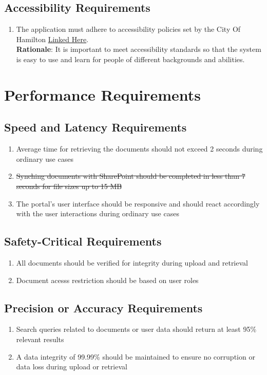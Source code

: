 \documentclass[12pt]{article}
\begin{document}
\subsection{Accessibility Requirements}
\begin{enumerate}[{UH-AS}1.]
  \item The application must adhere to accessibility policies set by the City Of
    Hamilton
    \href{https://www.hamilton.ca/people-programs/inclusion-diversity-equity-accessibility/accessibility-services/accessibility#policies-procedures}{Linked
    Here}.\\
    \textbf{Rationale}: It is important to meet accessibility standards so that
    the system is easy to use and learn for people of different backgrounds and
    abilities.
\end{enumerate}
\section{Performance Requirements}
\subsection{Speed and Latency Requirements}
\begin{enumerate}[{PR-SL}1.]
  \item Average time for retrieving the documents should not exceed 2 seconds during ordinary use cases
  \item \sout{Synching documents with SharePoint should be completed in
    less than 7 seconds for file sizes up to 15 MB}
  \item The portal's user interface should be responsive and should
    react accordingly with the user interactions during ordinary use cases
\end{enumerate}
\subsection{Safety-Critical Requirements}
\begin{enumerate}[{PR-SC}1.]
  \item All documents should be verified for integrity during upload
    and retrieval
  \item Document acesss restriction should be based on user roles
\end{enumerate}
\subsection{Precision or Accuracy Requirements}
\begin{enumerate}[{PR-PA}1.]
  \item Search queries related to documents or user data should
    return at least 95\% relevant results
  \item A data integrity of 99.99\% should be maintained to ensure no
    corruption or data loss during upload or retrieval
\end{enumerate}
\end{document}
